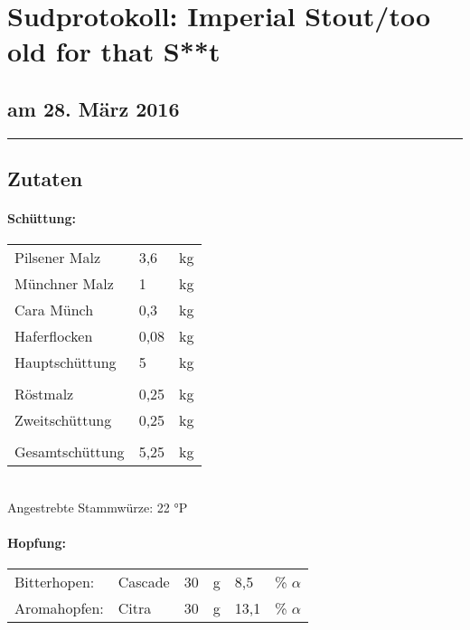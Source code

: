 \documentclass[12pt,oneside,a4paper]{scrartcl}
\begin{document}
	\begin{minipage}[c]{0.70\textwidth}
		\section*{\hspace{-.4cm}Sudprotokoll: Imperial Stout/{\large too old for that S**t} }
	\end{minipage}
	\begin{minipage}[c]{0.29\textwidth}
		\subsection*{am 28. März 2016}
	\end{minipage}
	\rule{\textwidth}{1pt}
%
\subsection*{Zutaten}
%
\paragraph{Schüttung:}
	\begin{tabular}[t]{m{8cm} m{2cm} m{1cm}}
		Pilsener Malz & 3,6 & kg \bigstrut\\
		Münchner Malz & 1 & kg \bigstrut\\
		Cara Münch & 0,3 & kg \bigstrut\\
		Haferflocken & 0,08 & kg \bigstrut\\ \hline
		Hauptschüttung & 5 & kg \bigstrut\\
		&&\\
		Röstmalz & 0,25 & kg \bigstrut\\\hline
		Zweitschüttung & 0,25 & kg \bigstrut\\
		&&\\\hline\hline
		Gesamtschüttung & 5,25 & kg\bigstrut
	\end{tabular}\\

\vspace{.25cm}
\hspace{1cm}Angestrebte Stammwürze: 22 °P
%
\paragraph{Hopfung:}
	\begin{tabular}[t]{m{2.5cm} m{5cm} m{0.5cm} m{1cm} m{0.5cm} m{1cm}}
		Bitterhopen: & Cascade & 30 & g & 8,5 & \% $\alpha$ \\
		Aromahopfen: & Citra & 30 & g & 13,1 &  \% $\alpha$
	\end{tabular}\\
\end{document}
